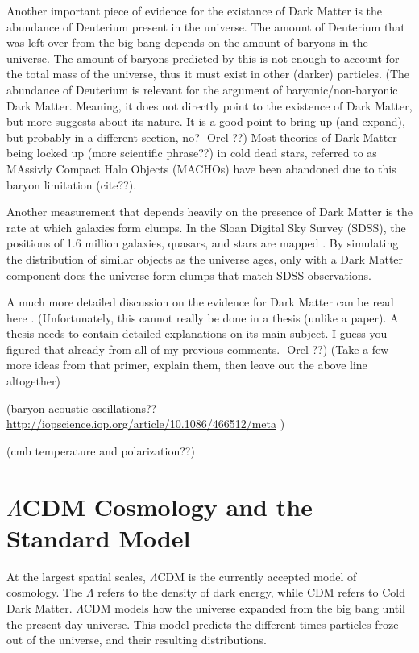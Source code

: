     Another important piece of evidence for the existance of Dark Matter is the abundance of Deuterium present in the universe.
    The amount of Deuterium that was left over from the big bang depends on the amount of baryons in the universe.
    The amount of baryons predicted by this is not enough to account for the total mass of the universe, thus it must exist in other (darker) particles.
    {\color{red}(The abundance of Deuterium is relevant for the argument of baryonic/non-baryonic Dark Matter. Meaning, it does not directly point to the existence of Dark Matter, but more suggests about its nature. It is a good point to bring up (and expand), but probably in a different section, no? -Orel ??)}
    Most theories of Dark Matter being {\color{red}locked up (more scientific phrase??)} in cold dead stars, referred to as MAssivly Compact Halo Objects (MACHOs) have been abandoned due to this baryon limitation {\color{red}(cite??)}.

    Another measurement that depends heavily on the presence of Dark Matter is the rate at which galaxies form clumps.
    In the Sloan Digital Sky Survey (SDSS), the positions of 1.6 million galaxies, quasars, and stars are mapped \cite{sdss_release}.
    By simulating the distribution of similar objects as the universe ages, only with a Dark Matter component does the universe form clumps that match SDSS observations.
  
    A much more detailed discussion on the evidence for Dark Matter can be read here \cite{DMPrimer}.
    {\color{red}(Unfortunately, this cannot really be done in a thesis (unlike a paper). A thesis needs to contain detailed explanations on its main subject. I guess you figured that already from all of my previous comments. -Orel ??)}
    {\color{red}(Take a few more ideas from that primer, explain them, then leave out the above line altogether)}

    {\color{red}(baryon acoustic oscillations?? \url{http://iopscience.iop.org/article/10.1086/466512/meta} )}
    
    
    {\color{red}(cmb temperature and polarization??)}
    

\section{$\Lambda$CDM Cosmology and the Standard Model}

  At the largest spatial scales, $\Lambda$CDM is the currently accepted model of cosmology.
  The $\Lambda$ refers to the density of dark energy, while CDM refers to Cold Dark Matter.
  $\Lambda$CDM models how the universe expanded from the big bang until the present day universe.
  This model predicts the different times particles froze out of the universe, and their resulting distributions.

